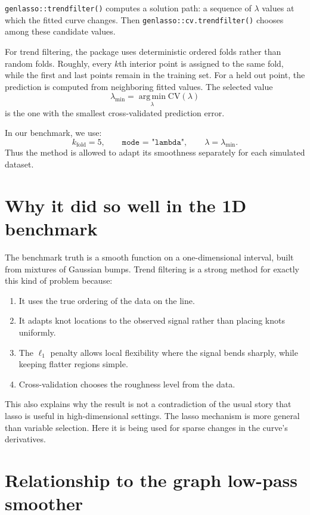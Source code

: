 \documentclass[11pt]{article}
\newcommand{\argmin}{\operatorname*{arg\,min}}
\begin{document}
\texttt{genlasso::trendfilter()} computes a solution path: a sequence of
\(\lambda\) values at which the fitted curve changes. Then
\texttt{genlasso::cv.trendfilter()} chooses among these candidate values.

For trend filtering, the package uses deterministic ordered folds rather than
random folds. Roughly, every \(k\)th interior point is assigned to the same
fold, while the first and last points remain in the training set. For a held
out point, the prediction is computed from neighboring fitted values. The
selected value
\[
\lambda_{\min}
=
\argmin_{\lambda}
\mathrm{CV}(\lambda)
\]
is the one with the smallest cross-validated prediction error.

In our benchmark, we use:
\[
k_{\mathrm{fold}} = 5,
\qquad
\texttt{mode = "lambda"},
\qquad
\lambda = \lambda_{\min}.
\]
Thus the method is allowed to adapt its smoothness separately for each
simulated dataset.

\section{Why it did so well in the 1D benchmark}

The benchmark truth is a smooth function on a one-dimensional interval, built
from mixtures of Gaussian bumps. Trend filtering is a strong method for exactly
this kind of problem because:
\begin{enumerate}
  \item It uses the true ordering of the data on the line.
  \item It adapts knot locations to the observed signal rather than placing
  knots uniformly.
  \item The \(\ell_1\) penalty allows local flexibility where the signal bends
  sharply, while keeping flatter regions simple.
  \item Cross-validation chooses the roughness level from the data.
\end{enumerate}

This also explains why the result is not a contradiction of the usual story
that lasso is useful in high-dimensional settings. The lasso mechanism is more
general than variable selection. Here it is being used for sparse changes in
the curve's derivatives.

\section{Relationship to the graph low-pass smoother}
\end{document}
